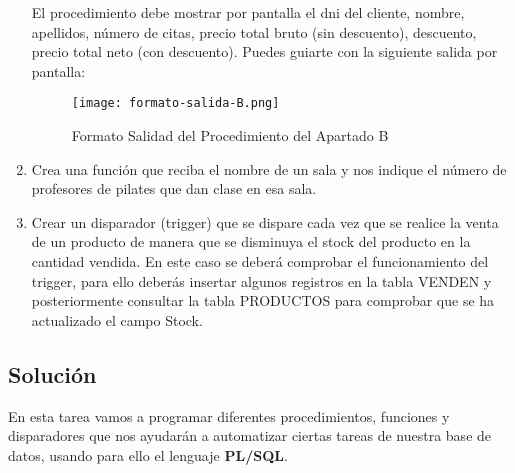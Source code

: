 \begin{enumerate}[label=\Alph*)]
    El procedimiento debe mostrar por pantalla el dni del cliente, nombre, apellidos, número de citas, precio total bruto (sin descuento), descuento, precio total neto  (con descuento). Puedes guiarte con la siguiente salida por pantalla:

   \begin{figure}[H]
        \centering
        \texttt{[image: formato-salida-B.png]}
        \caption{Formato Salidad del Procedimiento del Apartado B}
    \end{figure}

    \item Crea una función que reciba el nombre de un sala  y nos indique el número de profesores de pilates que dan clase en esa sala.

    \item Crear un disparador (trigger) que se dispare cada vez que se realice la venta de un producto de manera que se disminuya el stock del producto  en la cantidad vendida. En este caso se deberá comprobar el funcionamiento del trigger, para ello deberás insertar algunos registros en la tabla VENDEN y posteriormente consultar la tabla PRODUCTOS para comprobar que se ha actualizado el campo Stock.
\end{enumerate}

\subsection{Solución}
En esta tarea vamos a programar diferentes procedimientos, funciones y disparadores que nos ayudarán a automatizar ciertas tareas de nuestra base de datos, usando para ello el lenguaje \textbf{PL/SQL}.

